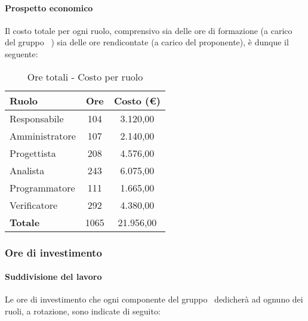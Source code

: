 \documentclass[../PianoProgetto.tex]{subfiles}
\begin{document}
	\paragraph{Prospetto economico}
					Il costo totale per ogni ruolo, comprensivo sia delle ore di formazione (a carico del gruppo \leaf\ ) sia delle ore rendicontate (a carico del proponente), è dunque il seguente:
	\begin{table}[h]
		\centering
		\begin{tabular}{l * {2}{c}}
			\toprule
			\textbf{Ruolo} & \textbf{Ore} & \textbf{Costo (\euro{})} \\
			\midrule
			Responsabile &	104 & 3.120,00 \\
			Amministratore & 107 & 2.140,00 \\
			Progettista & 208 & 4.576,00 \\
			Analista & 243 & 6.075,00 \\
			Programmatore & 111 & 1.665,00 \\
			Verificatore & 292 & 4.380,00 \\
			\midrule		
			\textbf{Totale} & 1065 &  21.956,00 \\
			\bottomrule
		\end{tabular}
		
		\caption{Ore totali - Costo per ruolo}
		\label{tab:totale_costo}
		
	\end{table}
	
	\subsubsection{Ore di investimento}
				\paragraph{Suddivisione del lavoro}
					Le ore di investimento che ogni componente del gruppo \leaf\ dedicherà ad ognuno dei ruoli, a rotazione, sono indicate di seguito:
	
\end{document}
